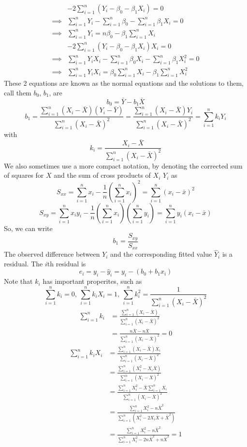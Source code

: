 \begin{align*}
    &-2\sum_{i=1}^n (Y_i - \beta_0 - \beta_1X_i) = 0\\
    \implies& \sum_{i=1}^n Y_i - \sum_{i=1}^n\beta_0 - \sum_{i=1}^n\beta_1X_i = 0 \\
    \implies&  \sum_{i=1}^n Y_i = n\beta_0 - \beta_1\sum_{i=1}^nX_i \\
    &-2\sum_{i=1}^n (Y_i - \beta_0 - \beta_1X_i)X_i = 0\\
    \implies& \sum_{i=1}^n Y_iX_i - \sum_{i=1}^n\beta_0 X_i -  \sum_{i=1}^n\beta_1X_i^2 = 0\\
    \implies& \sum_{i=1}^n Y_iX_i = \beta_0\sum_{i=1}^nX_i - \beta_1 \sum_{i=1}^nX_i^2
\end{align*}
These 2 equations are known as the normal equations and the solutions to them, call them $b_0$, $b_1$, are
\[b_0 = \bar{Y} - b_1\bar{X}\]
\[b_1 = \frac{\sum_{i=1}^n (X_i - \bar{X})(Y_i - \bar{Y})}{\sum_{i=1}^n (X_i - \bar{X})^2 } = \frac{\sum_{i=1}^n(X_i -\bar{X})Y_i}{\sum_{i=1}^n(X_i-\bar{X})^2} = \sum_{i=1}^n k_iY_i\]
with 
\[k_i = \frac{X_i - \bar{X}}{\sum_{i=1}^n (X_i - \bar{X})^2}\]
We also sometimes use a more compact notation, by denoting the corrected sum of squares for $X$ and the sum of cross products of $X_i$ $Y_i$ as 
\[S_{xx} = \sum_{i=1}^n x_i - \frac{1}{n} \left(\sum_{i=1}^n x_i\right)^2 = \sum_{i=1}^n (x_i - \bar{x})^2 \]
\[S_{xy} = \sum_{i=1}^n x_iy_i - \frac{1}{n}\left(\sum_{i=1}^n x_i\right)\left(\sum_{i=1}^n y_i\right) = \sum_{i=1}^n y_i(x_i - \bar{x})\]
So, we can write 
\[b_1 = \frac{S_{xy}}{S_{xx}}\]
The observed difference between $Y_i$ and the corresponding fitted value $\hat{Y}_i$ is a residual. The $i$th residual is 
\[e_i = y_i - \hat{y}_i = y_i - (b_0 + b_1x_i)\]
Note that $k_i$ has important properites, such as 
\[\sum_{i=1}^n k_i = 0, \ \sum_{i=1}^n k_iX_i = 1,\ \sum_{i=1}^n k_i^2 = \frac{1}{\sum_{i=1}^n (X_i - \bar{X})^2}\]
\begin{align*}
    \sum_{i=1}^n k_i &= \frac{\sum_{i=1}^n (X_i - \bar{X})}{\sum_{i=1}^n (X_i - \bar{X})^2}\\
    &= \frac{n\bar{X} - n\bar{X}}{\sum_{i=1}^n (X_i-\bar{X})^2 } = 0
\end{align*}
\begin{align*}
    \sum_{i=1}^n k_iX_i &= \frac{\sum_{i=1}^n (X_i - \bar{X})X_i}{\sum_{i=1}^n (X_i - \bar{X})^2}\\
    &= \frac{\sum_{i=1}^n (X_i^2 - X_i\bar{X})}{\sum_{i=1}^n  (X_i - \bar{X})^2}\\
    &= \frac{\sum_{i=1}^n X_i^2 - \bar{X}\sum_{i=1}^n X_i}{\sum_{i=1}^n (X_i - \bar{X})^2}\\
    &= \frac{\sum_{i=1}^n X_i^2 - n\bar{X}^2}{\sum_{i=1}^n (X_i^2 - 2X_i\bar{X} + \bar{X}^2)}\\
    &= \frac{\sum_{i=1}^n X_i^2 - n\bar{X}^2}{\sum_{i=1}^n X_i^2 - 2n\bar{X}^2 + n\bar{X}^2} = 1
\end{align*}
